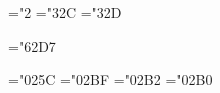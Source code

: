 {\if@usecmmi
 \mathchardef\cmminus="2
 \def\relbar{\mathrel{\smash{\cmminus}}}
 \mathchardef\lhook="3\cmmi@2C
 \def\hookrightarrow{\lhook\joinrel\cmsyrightarrow}
 \mathchardef\rhook="3\cmmi@2D
 \def\hookleftarrow{\cmsyleftarrow\joinrel\rhook}
\else
 \def\lhook{\@PSnofont\lhook}
 \def\rhook{\@PSnofont\rhook}
\fi

\def\Longrightarrow{\@PSsub\Longrightarrow\Rightarrow}
\def\Longleftarrow{\@PSsub\Longleftarrow\Leftarrow}

\if@usecmsy
 \def\longrightarrow{\protect\@lra}
   \def\@lra{\relbar\joinrel\cmsyrightarrow}
 \def\longleftarrow{\protect\@lla}
    \def\@lla{\cmsyleftarrow\joinrel\relbar}
 \def\longmapsto{\mapstochar\longrightarrow}
 \def\longleftrightarrow{\cmsyleftarrow\joinrel\cmsyrightarrow}
 \def\Longleftrightarrow{\cmsyLeftarrow\joinrel\cmsyRightarrow}
\fi

\def\rightarrowfill{$\m@th\cmminus\mkern-6mu%
  \cleaders\hbox{$\mkern-2mu\cmminus\mkern-2mu$}\hfill
  \mkern-6mu\mathord\cmsyrightarrow$}
\def\leftarrowfill{$\m@th\mathord\cmsyleftarrow\mkern-6mu%
  \cleaders\hbox{$\mkern-2mu\cmminus\mkern-2mu$}\hfill
  \mkern-6mu\cmminus$}

\mathchardef\cdotp="62D7 %

\mathchardef\therefore="025C
\mathchardef\cret="02BF
\mathchardef\seconds="02B2
\mathchardef\degree="02B0


\def\ualpha{\mathhexbox261}
\def\ubeta{\mathhexbox262}
\def\ugamma{\mathhexbox267}
\def\udelta{\mathhexbox264}
\def\uepsilon{\mathhexbox265}
\def\uzeta{\mathhexbox27A}
\def\ueta{\mathhexbox268}
\def\utheta{\mathhexbox271}
\def\uiota{\mathhexbox269}
\def\ukappa{\mathhexbox26B}
\def\ulambda{\mathhexbox26C}
\def\umu{\mathhexbox26D}
\def\unu{\mathhexbox26E}
\def\uxi{\mathhexbox278}
\def\upi{\mathhexbox270}
\def\urho{\mathhexbox272}
\def\usigma{\mathhexbox273}
\def\utau{\mathhexbox274}
\def\uupsilon{\mathhexbox275}
\def\uphi{\mathhexbox266}
\def\uchi{\mathhexbox263}
\def\upsi{\mathhexbox279}
\def\uomega{\mathhexbox277}
\def\uvartheta{\mathhexbox24A}
\def\uvarpi{\mathhexbox276}
\def\uvarsigma{\mathhexbox256}
\def\uvarphi{\mathhexbox26A}

\def\acute{\mathaccent"70C2 }
\def\grave{\mathaccent"70C1 }
\def\ddot{\mathaccent"70C8 }
\def\tilde{\mathaccent"70C4 }
\def\bar{\mathaccent"70C5 }
\def\breve{\mathaccent"70C6 }
\def\check{\mathaccent"70CF }
\def\hat{\mathaccent"70C3 }
\if@usecmmi
 \def\vec{\mathaccent"0\cmmi@7E }
\else
 \def\vec{\@PSnofont\vec}
\fi
\def\dot{\mathaccent"70C7 }

}
